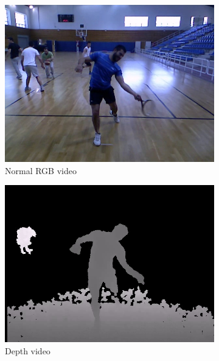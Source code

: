 \begin{figure}
    \centering
    \begin{subfigure}{.52\linewidth}
        \includegraphics[width=\linewidth]{Pics/04_Data/frame53.jpg}
        \caption{Normal RGB video}
    \end{subfigure}
    \begin{subfigure}{.49\linewidth}
        \includegraphics[width=\linewidth]{Pics/04_Data/frame53_depth.jpg}
        \caption{Depth video}
    \end{subfigure}
    \begin{subfigure}{.49\linewidth}

\end{subfigure}
\end{figure}
